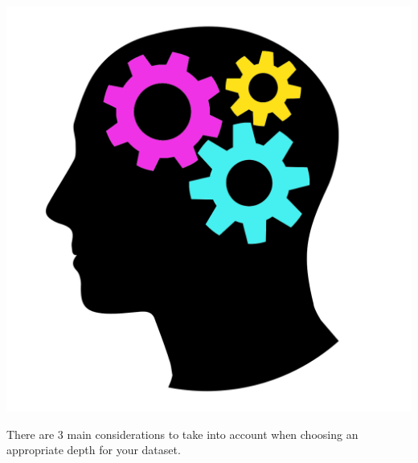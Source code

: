 \documentclass[
]{book}
\begin{document}
\includegraphics{figures/consider.png}

There are 3 main considerations to take into account when choosing an appropriate depth for your dataset.
\end{document}
